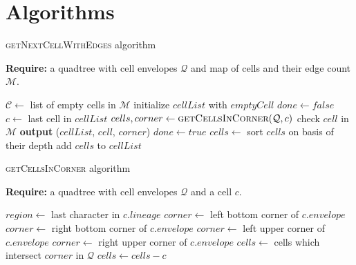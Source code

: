\documentclass{article}
\begin{document}
    
    \section*{Algorithms}
    \begin{algorithm} \caption{\textsc{getNextCellWithEdges} algorithm}
        \textbf{Require:} a quadtree with cell envelopes $\mathcal Q$ and map of cells and their edge count $\mathcal M$.
        \begin{algorithmic}[1]
            \State $\mathcal C \gets $ list of empty cells in $\mathcal M$
                \State initialize $cellList$ with $emptyCell$ 
                \State $done \gets false$
                \Repeat
                    \State $c \gets $ last cell in $cellList$ 
                    \State $cells, corner \gets \textsc{getCellsInCorner}(\mathcal Q, c)$ 
                        \State check $cell$ in $\mathcal M$ 
                            \State \textbf{output} ($cellList$, $cell$, $corner$)
                            \State $done \gets true$
                        \EndIf
                    \EndFor
                        \State $cells \gets$ sort $cells$ on basis of their depth 
                        \State add $cells$ to $cellList$
                    \EndIf
            \EndFor
        \EndFunction
        \end{algorithmic}
    \end{algorithm}
    
    \begin{algorithm} \caption{\textsc{getCellsInCorner} algorithm}
        \textbf{Require:} a quadtree with cell envelopes $\mathcal Q$ and a cell $c$.
        \begin{algorithmic}[1]
            \State $region \gets $ last character in $c.lineage$
                    \State $corner \gets$ left bottom corner of $c.envelope$
                \EndCase
                    \State $corner \gets$ right bottom corner of $c.envelope$
                \EndCase
                    \State $corner \gets$ left upper corner of $c.envelope$
                \EndCase
                    \State $corner \gets$ right upper corner of $c.envelope$
                \EndCase
            \EndSwitch
            \State $cells \gets$ cells which intersect $corner$ in $\mathcal Q$
            \State $cells \gets cells - c$ 
            \State {}
        \EndFunction
        \end{algorithmic}
    \end{algorithm}
    
\end{document}
